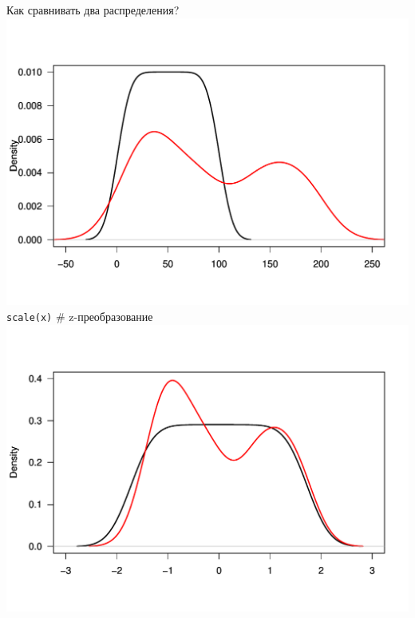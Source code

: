 \begin{frame}{Как сравнивать два распределения?}
\includegraphics[width=0.62\linewidth]{1density.pdf}\pause \\
\scriptsize \verb"scale(x)" \normalsize \hfill \# z-преобразование\\
\includegraphics[width=0.62\linewidth]{2density.pdf}
\end{frame}
